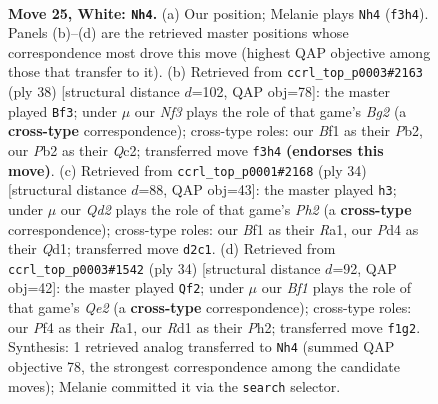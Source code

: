 \documentclass[11pt]{article}
\begin{document}
\clearpage

\begin{figure}[p]\centering
\begin{subfigure}{0.46\textwidth}\centering
\resizebox{\linewidth}{!}{%
\newchessgame
\chessboard[
  setfen={1nb1qr2/rp3k2/2p1p3/p2p1p1p/Pn1P1P2/2N2NP1/1PPQ3P/3R1BKR w - - 3 25},
  showmover=false,
  pgfstyle=straightmove, color=movearrow, markmove={f3-h4}
]}
\caption{}
\end{subfigure}\hfill
\begin{subfigure}{0.46\textwidth}\centering
\resizebox{\linewidth}{!}{%
\newchessgame
\chessboard[
  setfen={r4qrk/p2bb1pp/1pp1pp2/3n4/2NPNP2/P3P3/1PQ2PBP/2R3RK w - - 2 20},
  showmover=false,
  pgfstyle=straightmove, color=movearrow, markmove={g2-f3}
]}
\caption{}
\end{subfigure}
\\[4pt]
\begin{subfigure}{0.46\textwidth}\centering
\resizebox{\linewidth}{!}{%
\newchessgame
\chessboard[
  setfen={r1r2bk1/3q1pp1/np1ppn1p/p7/3PP3/P4NN1/1P1B1PPP/R2QR1K1 w - - 2 18},
  showmover=false,
  pgfstyle=straightmove, color=movearrow, markmove={h2-h3}
]}
\caption{}
\end{subfigure}\hfill
\begin{subfigure}{0.46\textwidth}\centering
\resizebox{\linewidth}{!}{%
\newchessgame
\chessboard[
  setfen={rnq2rk1/1p1bnp1p/p2pp1p1/P7/3NPP2/2NB4/1PP1Q1PP/R4RK1 w - - 1 18},
  showmover=false,
  pgfstyle=straightmove, color=movearrow, markmove={e2-f2}
]}
\caption{}
\end{subfigure}
\caption{\textbf{Move 25, White: \texttt{Nh4}.} (a) Our position; Melanie plays \texttt{Nh4} (\texttt{f3h4}). Panels (b)--(d) are the retrieved master positions whose correspondence most drove this move (highest QAP objective among those that transfer to it). (b) Retrieved from \texttt{ccrl\_top\_p0003\#2163} (ply 38) [structural distance $d$=102, QAP obj=78]: the master played \texttt{Bf3}; under $\mu$ our \emph{Nf3} plays the role of that game's \emph{Bg2} (a \textbf{cross-type} correspondence); cross-type roles: our \emph{B}f1 as their \emph{P}b2, our \emph{P}b2 as their \emph{Q}c2; transferred move \texttt{f3h4} \textbf{(endorses this move)}. (c) Retrieved from \texttt{ccrl\_top\_p0001\#2168} (ply 34) [structural distance $d$=88, QAP obj=43]: the master played \texttt{h3}; under $\mu$ our \emph{Qd2} plays the role of that game's \emph{Ph2} (a \textbf{cross-type} correspondence); cross-type roles: our \emph{B}f1 as their \emph{R}a1, our \emph{P}d4 as their \emph{Q}d1; transferred move \texttt{d2c1}. (d) Retrieved from \texttt{ccrl\_top\_p0003\#1542} (ply 34) [structural distance $d$=92, QAP obj=42]: the master played \texttt{Qf2}; under $\mu$ our \emph{Bf1} plays the role of that game's \emph{Qe2} (a \textbf{cross-type} correspondence); cross-type roles: our \emph{P}f4 as their \emph{R}a1, our \emph{R}d1 as their \emph{P}h2; transferred move \texttt{f1g2}. Synthesis: 1 retrieved analog transferred to \texttt{Nh4} (summed QAP objective 78, the strongest correspondence among the candidate moves); Melanie committed it via the \texttt{search} selector.}
\label{fig:thought-m48}
\end{figure}
\end{document}
